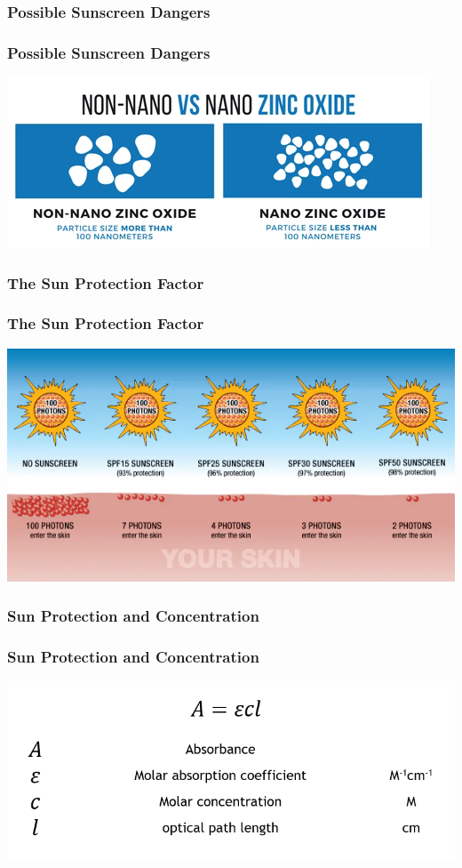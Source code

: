 \documentclass{beamer} %
\begin{document}
\subsubsection{Possible Sunscreen Dangers}
\begin{frame}\centering
  \frametitle{Possible Sunscreen Dangers}
  \includegraphics[scale = 0.65]{NonNanovsNanoZO.png}
\end{frame}
\subsubsection{The Sun Protection Factor}
\begin{frame}\centering
  \frametitle{The Sun Protection Factor}
  \includegraphics[scale = 0.5]{SPF.png}
\end{frame}
\subsubsection{Sun Protection and Concentration}
\begin{frame}\centering
  \frametitle{Sun Protection and Concentration}
  \includegraphics[scale = 0.65]{beerlambert.png}
\end{frame}
\end{document}
